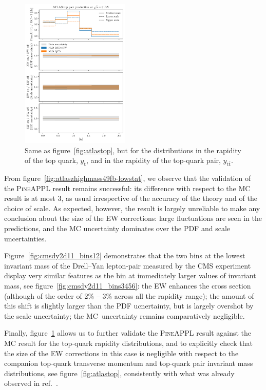 \begin{figure}[!p]
    \centering
    \includegraphics[width=0.46\textwidth]{figures/pineappl_ATLAS_TTB_DIFF_8TEV_LJ_TRAP}%
    \caption{Same as figure~\ref{fig:atlastop}, but for the distributions
      in the rapidity of the top quark, $y_{\mathrm{t}}$, and in the rapidity of
      the top-quark pair, $y_{\mathrm{t}\bar{\mathrm{t}}}$.}
    \label{fig:atlastop-rap}
\end{figure}

From figure~\ref{fig:atlaszhighmass49fb-lowstat}, we observe that the validation
of the \textsc{PineAPPL} result remains successful: its difference with respect
to the MC result is at most \SI{3}{\permille}, as usual irrespective of the
accuracy of the theory and of the choice of scale. As expected, however, the
result is largely unreliable to make any conclusion about the size of the EW
corrections: large fluctuations are seen in the predictions, and the MC
uncertainty dominates over the PDF and scale uncertainties.

Figure~\ref{fig:cmsdy2d11_bins12} demonstrates that the two bins at the
lowest invariant mass of the Drell--Yan lepton-pair measured by the CMS
experiment display very similar features as the bin at immediately larger
values of invariant mass, see figure~\ref{fig:cmsdy2d11_bins3456}: the EW
enhances the cross section (although of the order of 2\% -- 3\% across all the
rapidity range); the amount of this shift is slightly larger than the PDF
ucnertainty, but is largely overshot by the scale uncertainty; the MC\
uncertainty remains comparatively negligible.

Finally, figure~\ref{fig:atlastop-rap} allows us to further validate the
\textsc{PineAPPL} result against the MC result for the top-quark
rapidity distributions, and to explicitly check that the size of the EW
corrections in this case is negligible with respect to the companion
top-quark transverse momentum and top-quark pair invariant mass distributions,
see figure~\ref{fig:atlastop}, consistently with what was already observed in
ref.~\cite{Czakon:2017wor}.
